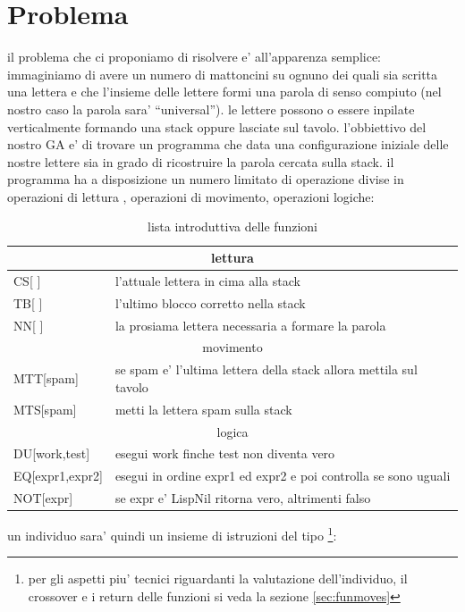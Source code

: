 \documentclass[12pt, a4paper]{article}
\begin{document}
\section{Problema}
il problema che ci proponiamo di risolvere e' all'apparenza semplice:
immaginiamo di avere un numero di mattoncini su ognuno dei quali sia scritta una lettera e che l'insieme delle lettere formi una parola di senso compiuto (nel nostro caso la parola sara' ``universal'').
le lettere possono o essere inpilate verticalmente formando una stack oppure lasciate sul tavolo.
l'obbiettivo del nostro GA e' di trovare un programma che data una configurazione iniziale delle nostre lettere sia in grado di ricostruire la parola cercata sulla stack.
il programma ha a disposizione un numero limitato di operazione divise in operazioni di lettura , operazioni di movimento, operazioni logiche:

\begin{table}[hbp]
\begin{tabular}[b]{|l|l|}
\hline
\multicolumn{2}{|c|}{lettura} \\
\hline
CS[ ] 	& l'attuale lettera in cima alla stack \\
TB[ ] 	& l'ultimo blocco corretto nella stack \\
NN[ ] 	& la prosiama lettera necessaria a formare la parola\\
\hline
\multicolumn{2}{|c|}{movimento}\\
\hline
MTT[spam]	& se spam e' l'ultima lettera della stack allora mettila sul tavolo\\
MTS[spam]	& metti la lettera spam sulla stack \\
\hline
\multicolumn{2}{|c|}{logica}\\
\hline
DU[work,test]	&	esegui work finche test non diventa vero\\
EQ[expr1,expr2] &	esegui in ordine expr1 ed expr2 e poi controlla se sono uguali\\
NOT[expr] 		&	se expr e' LispNil ritorna vero, altrimenti falso \\
\hline
\end{tabular}
\caption{lista introduttiva delle funzioni}
\label{table:introfun}
\end{table}


un individuo sara' quindi un insieme di istruzioni del tipo
\footnote{per gli aspetti piu' tecnici riguardanti la valutazione dell'individuo, il crossover e i return delle funzioni si veda la sezione \ref{sec:funmoves} }:
\end{document}
